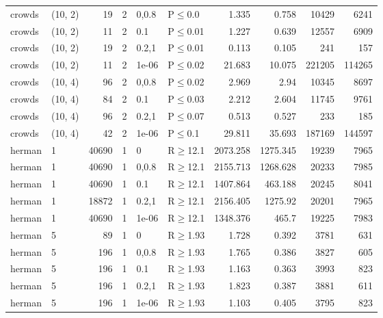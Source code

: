 \begin{longtable}{llrrllrrrr}
 crowds        & (10, 2)  &     	19 &   2 & 0,0.8 & P$\leq$0.0   & 1.335    & 0.758    & 10429   & 6241   \\
 crowds        & (10, 2)  &     	11 &   2 & 0.1   & P$\leq$0.01  & 1.227    & 0.639    & 12557   & 6909   \\
 crowds        & (10, 2)  &     	19 &   2 & 0.2,1 & P$\leq$0.01  & 0.113    & 0.105    & 241     & 157    \\
 crowds        & (10, 2)  &     	11 &   2 & 1e-06 & P$\leq$0.02  & 21.683   & 10.075   & 221205  & 114265 \\
 crowds        & (10, 4)  &     	96 &   2 & 0,0.8 & P$\leq$0.02  & 2.969    & 2.94     & 10345   & 8697   \\
 crowds        & (10, 4)  &     	84 &   2 & 0.1   & P$\leq$0.03  & 2.212    & 2.604    & 11745   & 9761   \\
 crowds        & (10, 4)  &     	96 &   2 & 0.2,1 & P$\leq$0.07  & 0.513    & 0.527    & 233     & 185    \\
 crowds        & (10, 4)  &     	42 &   2 & 1e-06 & P$\leq$0.1   & 29.811   & 35.693   & 187169  & 144597 \\
 herman        & 1        &  	40690 &   1 & 0     & R$\geq$12.1  & 2073.258 & 1275.345 & 19239   & 7965   \\
 herman        & 1        &  	40690 &   1 & 0,0.8 & R$\geq$12.1  & 2155.713 & 1268.628 & 20233   & 7985   \\
 herman        & 1        &  	40690 &   1 & 0.1   & R$\geq$12.1  & 1407.864 & 463.188  & 20245   & 8041   \\
 herman        & 1        &  	18872 &   1 & 0.2,1 & R$\geq$12.1  & 2156.405 & 1275.92  & 20201   & 7965   \\
 herman        & 1        &  	40690 &   1 & 1e-06 & R$\geq$12.1  & 1348.376 & 465.7    & 19225   & 7983   \\
 herman        & 5        &     	89 &   1 & 0     & R$\geq$1.93  & 1.728    & 0.392    & 3781    & 631    \\
 herman        & 5        &    	196 &   1 & 0,0.8 & R$\geq$1.93  & 1.765    & 0.386    & 3827    & 605    \\
 herman        & 5        &    	196 &   1 & 0.1   & R$\geq$1.93  & 1.163    & 0.363    & 3993    & 823    \\
 herman        & 5        &    	196 &   1 & 0.2,1 & R$\geq$1.93  & 1.823    & 0.387    & 3881    & 611    \\
 herman        & 5        &    	196 &   1 & 1e-06 & R$\geq$1.93  & 1.103    & 0.405    & 3795    & 823    \\

\end{longtable}
